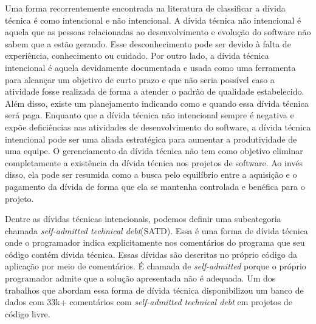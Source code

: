 Uma forma recorrentemente encontrada na literatura de classificar a dívida técnica é como intencional e não intencional\cite{sterling2010managing,brown2010managing,klinger2011enterprise}. A dívida técnica não intencional é aquela que as pessoas relacionadas ao desenvolvimento e evolução do software não sabem que a estão gerando. Esse desconhecimento pode ser devido à falta de experiência, conhecimento ou cuidado. Por outro lado, a dívida técnica intencional é aquela devidamente documentada e usada como uma ferramenta para alcançar um objetivo de curto prazo e que não seria possível caso a atividade fosse realizada de forma a atender o padrão de qualidade estabelecido.  Além disso, existe um planejamento indicando como e quando essa dívida técnica será paga. Enquanto que a dívida técnica não intencional sempre é negativa e expõe deficiências nas atividades de desenvolvimento do software, a dívida técnica intencional pode ser uma aliada estratégica para aumentar a produtividade de uma equipe. O gerenciamento da dívida técnica não tem como objetivo eliminar completamente a existência da dívida técnica nos projetos de software. Ao invés disso, ela pode ser resumida como a busca pelo equilíbrio entre a aquisição e o pagamento da dívida de forma que ela se mantenha controlada e benéfica para o projeto. 

Dentre as dívidas técnicas intencionais, podemos definir uma subcategoria chamada \textit{self-admitted technical debt}(SATD). Essa é uma forma de dívida técnica onde o programador indica explicitamente nos comentários do programa que seu código contém dívida técnica. Essas dívidas são descritas no próprio código da aplicação por meio de comentários. É chamada de \textit{self-admitted} porque o próprio programador admite que a solução apresentada não é adequada. Um dos trabalhos que abordam essa forma de dívida técnica\cite{maldonado2015detecting} disponibilizou um banco de dados com  33k+ comentários com \textit{self-admitted technical debt} em projetos de código livre.


